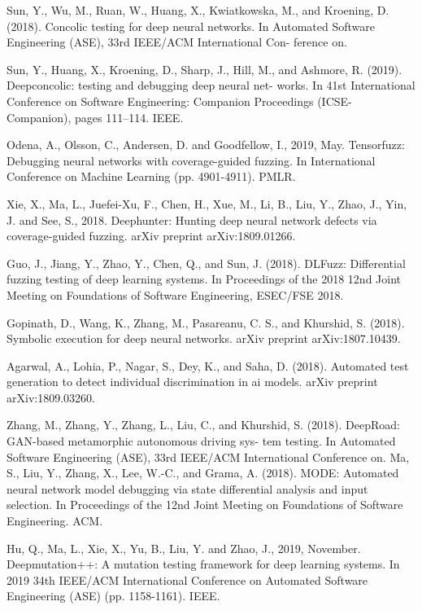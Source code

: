 \begin{singlespace}
\begin{thebibliography}{}
 Sun, Y., Wu, M., Ruan, W., Huang, X., Kwiatkowska, M., and Kroening, D. (2018). Concolic testing for deep neural networks. In Automated Software Engineering (ASE), 33rd IEEE/ACM International Con- ference on.

 Sun, Y., Huang, X., Kroening, D., Sharp, J., Hill, M., and Ashmore, R. (2019). Deepconcolic: testing and debugging deep neural net- works. In 41st International Conference on Software Engineering: Companion Proceedings (ICSE-Companion), pages 111–114. IEEE.

 Odena, A., Olsson, C., Andersen, D. and Goodfellow, I., 2019, May. Tensorfuzz: Debugging neural networks with coverage-guided fuzzing. In International Conference on Machine Learning (pp. 4901-4911). PMLR.

Xie, X., Ma, L., Juefei-Xu, F., Chen, H., Xue, M., Li, B., Liu, Y., Zhao, J., Yin, J. and See, S., 2018. Deephunter: Hunting deep neural network defects via coverage-guided fuzzing. arXiv preprint arXiv:1809.01266.

 Guo, J., Jiang, Y., Zhao, Y., Chen, Q., and Sun, J. (2018). DLFuzz: Differential fuzzing testing of deep learning systems. In Proceedings of the 2018 12nd Joint Meeting on Foundations of Software Engineering, ESEC/FSE 2018.

 Gopinath, D., Wang, K., Zhang, M., Pasareanu, C. S., and Khurshid, S. (2018). Symbolic execution for deep neural networks. arXiv preprint arXiv:1807.10439.

 Agarwal, A., Lohia, P., Nagar, S., Dey, K., and Saha, D. (2018). Automated test generation to detect individual discrimination in ai
models. arXiv preprint arXiv:1809.03260.

 Zhang, M., Zhang, Y., Zhang, L., Liu, C., and Khurshid, S. (2018). DeepRoad: GAN-based metamorphic autonomous driving sys- tem testing. In Automated Software Engineering (ASE), 33rd IEEE/ACM International Conference on.
 Ma, S., Liu, Y., Zhang, X., Lee, W.-C., and Grama, A. (2018). MODE: Automated neural network model debugging via state differential analysis and input selection. In Proceedings of the 12nd Joint Meeting on Foundations of Software Engineering. ACM.

Hu, Q., Ma, L., Xie, X., Yu, B., Liu, Y. and Zhao, J., 2019, November. Deepmutation++: A mutation testing framework for deep learning systems. In 2019 34th IEEE/ACM International Conference on Automated Software Engineering (ASE) (pp. 1158-1161). IEEE.


\end{thebibliography}
\end{singlespace}
